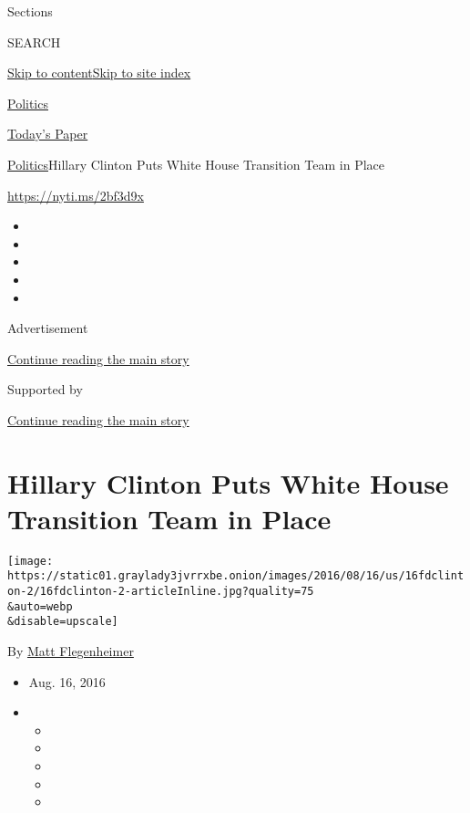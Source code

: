 Sections

SEARCH

\protect\hyperlink{site-content}{Skip to
content}\protect\hyperlink{site-index}{Skip to site index}

\href{https://www.nytimes3xbfgragh.onion/section/politics}{Politics}

\href{https://myaccount.nytimes3xbfgragh.onion/auth/login?response_type=cookie\&client_id=vi}{}

\href{https://www.nytimes3xbfgragh.onion/section/todayspaper}{Today's
Paper}

\href{/section/politics}{Politics}\textbar{}Hillary Clinton Puts White
House Transition Team in Place

\url{https://nyti.ms/2bf3d9x}

\begin{itemize}
\item
\item
\item
\item
\item
\end{itemize}

Advertisement

\protect\hyperlink{after-top}{Continue reading the main story}

Supported by

\protect\hyperlink{after-sponsor}{Continue reading the main story}

\hypertarget{hillary-clinton-puts-white-house-transition-team-in-place}{%
\section{Hillary Clinton Puts White House Transition Team in
Place}\label{hillary-clinton-puts-white-house-transition-team-in-place}}

\texttt{[image: https://static01.graylady3jvrrxbe.onion/images/2016/08/16/us/16fdclinton-2/16fdclinton-2-articleInline.jpg?quality=75\\\&auto=webp\\\&disable=upscale]}

By \href{http://www.nytimes3xbfgragh.onion/by/matt-flegenheimer}{Matt
Flegenheimer}

\begin{itemize}
\item
  Aug. 16, 2016
\item
  \begin{itemize}
  \item
  \item
  \item
  \item
  \item
  \end{itemize}
\end{itemize}

